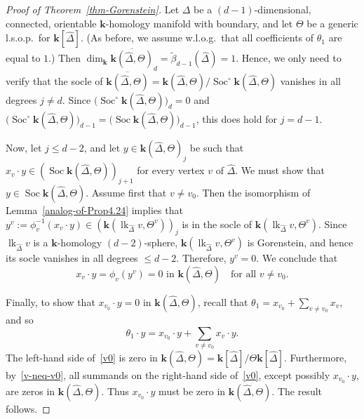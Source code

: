 \documentclass[ALCO,ThmDefs,Unicode,epreuves]{cedram}
\DeclareMathOperator\lk{lk}
\DeclareMathOperator{\Soc}{Soc}
\newcommand{\complet}[1]{\hat{#1}}
\newcommand{\field}{\mathbf{k}}
\begin{document}
\begin{proof}[Proof of Theorem~\ref{thm-Gorenstein}]
Let $\Delta$ be a $(d-1)$-dimensional, connected, orientable $\field$-homology manifold with boundary, and let $\Theta$ be a generic l.s.o.p.~for $\field[\complet{\Delta}]$. (As before, we assume w.l.o.g.~that all coefficients of $\theta_1$ are equal to $1$.) Then $\dim_\field \overline{\field(\complet{\Delta},\Theta)}_d =\tilde{\beta}_{d-1}(\complet{\Delta})=1$. Hence, we only need to verify that the socle of $\overline{\field(\complet{\Delta},\Theta)}=\field(\complet{\Delta},\Theta)/\Soc^\circ \field(\complet{\Delta},\Theta)$ vanishes in all degrees $j\neq d$. Since $\big(\Soc^\circ \field(\complet{\Delta},\Theta)\big)_d=0$ and $\big(\Soc^\circ \field(\complet{\Delta},\Theta)\big)_{d-1}=\big(\Soc \field(\complet{\Delta},\Theta)\big)_{d-1}$, this does hold for $j=d-1$.

Now, let $j\leq d-2$, and let $y\in \field(\complet{\Delta},\Theta)_j$ be such that $x_v\cdot y\in (\Soc \field(\complet{\Delta},\Theta))_{j+1}$ for every vertex $v$ of $\complet{\Delta}$. We must show that $y\in \Soc \field(\complet{\Delta},\Theta)$. Assume first that $v\neq v_0$. Then the isomorphism of Lemma~\ref{analog-of-Prop4.24} implies that $y^v:=\phi_v^{-1}(x_v\cdot y)\in (\field(\lk_{\complet{\Delta}}v, \Theta^v))_j$ is in the socle of $\field(\lk_{\complet{\Delta}}v, \Theta^v)$. Since $\lk_{\complet{\Delta}}v$ is a $\field$-homology $(d-2)$-sphere, $\field(\lk_{\complet{\Delta}}v, \Theta^v)$ is Gorenstein, and hence its socle vanishes in all degrees $\leq d-2$. Therefore, $y^v=0$. We conclude that
\begin{equation} \label{v-neq-v0}
x_v\cdot y=\phi_v(y^v)=0 \mbox{ in } \field(\complet{\Delta},\Theta) \quad \mbox{for all } v\neq v_0.
\end{equation}

Finally, to show that $x_{v_0}\cdot y=0$ in $\field(\complet{\Delta},\Theta)$, recall that $\theta_1=x_{v_0}+\sum_{v\neq v_0}x_v$, and so
\begin{equation} \label{v0}
\theta_1\cdot y=x_{v_0}\cdot y + \sum_{v\neq v_0} x_v\cdot y.
\end{equation}
The left-hand side of~\eqref{v0} is zero in $\field(\complet{\Delta},\Theta)=\field[\complet{\Delta}]/\Theta\field[\complet{\Delta}]$. Furthermore, by~\eqref{v-neq-v0}, all summands on the right-hand side of~\eqref{v0}, except possibly $x_{v_0}\cdot y$, are zeros in $\field(\complet{\Delta},\Theta)$. Thus $x_{v_0}\cdot y$ must be zero in $\field(\complet{\Delta},\Theta)$. The result follows. 
\end{proof}
\end{document}
